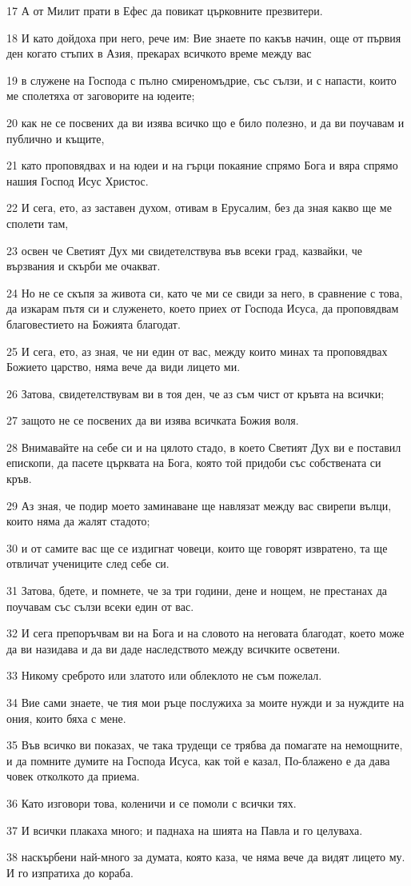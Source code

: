 \par 17 А от Милит прати в Ефес да повикат църковните презвитери.
\par 18 И като дойдоха при него, рече им: Вие знаете по какъв начин, още от първия ден когато стъпих в Азия, прекарах всичкото време между вас
\par 19 в служене на Господа с пълно смиреномъдрие, със сълзи, и с напасти, които ме сполетяха от заговорите на юдеите;
\par 20 как не се посвених да ви изява всичко що е било полезно, и да ви поучавам и публично и къщите,
\par 21 като проповядвах и на юдеи и на гърци покаяние спрямо Бога и вяра спрямо нашия Господ Исус Христос.
\par 22 И сега, ето, аз заставен духом, отивам в Ерусалим, без да зная какво ще ме сполети там,
\par 23 освен че Светият Дух ми свидетелствува във всеки град, казвайки, че вързвания и скърби ме очакват.
\par 24 Но не се скъпя за живота си, като че ми се свиди за него, в сравнение с това, да изкарам пътя си и служенето, което приех от Господа Исуса, да проповядвам благовестието на Божията благодат.
\par 25 И сега, ето, аз зная, че ни един от вас, между които минах та проповядвах Божието царство, няма вече да види лицето ми.
\par 26 Затова, свидетелствувам ви в тоя ден, че аз съм чист от кръвта на всички;
\par 27 защото не се посвених да ви изява всичката Божия воля.
\par 28 Внимавайте на себе си и на цялото стадо, в което Светият Дух ви е поставил епископи, да пасете църквата на Бога, която той придоби със собствената си кръв.
\par 29 Аз зная, че подир моето заминаване ще навлязат между вас свирепи вълци, които няма да жалят стадото;
\par 30 и от самите вас ще се издигнат човеци, които ще говорят извратено, та ще отвличат учениците след себе си.
\par 31 Затова, бдете, и помнете, че за три години, дене и нощем, не престанах да поучавам със сълзи всеки един от вас.
\par 32 И сега препоръчвам ви на Бога и на словото на неговата благодат, което може да ви назидава и да ви даде наследството между всичките осветени.
\par 33 Никому среброто или златото или облеклото не съм пожелал.
\par 34 Вие сами знаете, че тия мои ръце послужиха за моите нужди и за нуждите на ония, които бяха с мене.
\par 35 Във всичко ви показах, че така трудещи се трябва да помагате на немощните, и да помните думите на Господа Исуса, как той е казал, По-блажено е да дава човек отколкото да приема.
\par 36 Като изговори това, коленичи и се помоли с всички тях.
\par 37 И всички плакаха много; и паднаха на шията на Павла и го целуваха.
\par 38 наскърбени най-много за думата, която каза, че няма вече да видят лицето му. И го изпратиха до кораба.


